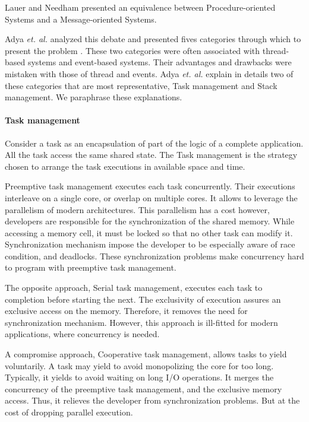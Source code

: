 Lauer and Needham \cite{Lauer1979} presented an equivalence between Procedure-oriented Systems and a Message-oriented Systems.



Adya \textit{et. al.} analyzed this debate and presented fives categories through which to present the problem \cite{Adya2002}.
These two categories were often associated with thread-based systems and event-based systems.
Their advantages and drawbacks were mistaken with those of thread and events.
Adya \textit{et. al.} explain in details two of these categories that are most representative, Task management and Stack management.
We paraphrase these explanations.

\paragraph{Task management}

Consider a task as an encapsulation of part of the logic of a complete application.
All the task access the same shared state.
The Task management is the strategy chosen to arrange the task executions in available space and time.

Preemptive task management executes each task concurrently.
Their executions interleave on a single core, or overlap on multiple cores.
It allows to leverage the parallelism of modern architectures.
This parallelism has a cost however, developers are responsible for the synchronization of the shared memory.
While accessing a memory cell, it must be locked so that no other task can modify it.
Synchronization mechanism impose the developer to be especially aware of race condition, and deadlocks.
These synchronization problems make concurrency hard to program with preemptive task management.

The opposite approach, Serial task management, executes each task to completion before starting the next.
The exclusivity of execution assures an exclusive access on the memory.
Therefore, it removes the need for synchronization mechanism.
However, this approach is ill-fitted for modern applications, where concurrency is needed.

A compromise approach, Cooperative task management, allows tasks to yield voluntarily.
A task may yield to avoid monopolizing the core for too long.
Typically, it yields to avoid waiting on long I/O operations.
It merges the concurrency of the preemptive task management, and the exclusive memory access.
Thus, it relieves the developer from synchronization problems.
But at the cost of dropping parallel execution.

